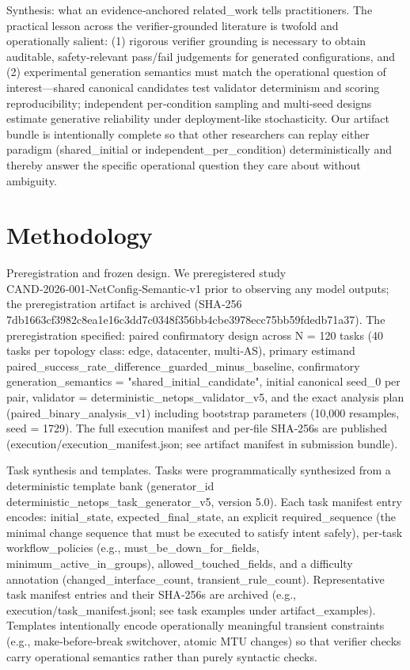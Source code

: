 \documentclass[conference]{IEEEtran}
\begin{document}
Synthesis: what an evidence‑anchored related\_work tells practitioners. The practical lesson across the verifier‑grounded literature is twofold and operationally salient: (1) rigorous verifier grounding is necessary to obtain auditable, safety‑relevant pass/fail judgements for generated configurations, and (2) experimental generation semantics must match the operational question of interest---shared canonical candidates test validator determinism and scoring reproducibility; independent per‑condition sampling and multi‑seed designs estimate generative reliability under deployment‑like stochasticity. Our artifact bundle is intentionally complete so that other researchers can replay either paradigm (shared\_initial or independent\_per\_condition) deterministically and thereby answer the specific operational question they care about without ambiguity.

\section{Methodology}
Preregistration and frozen design. We preregistered study CAND‑2026‑001‑NetConfig‑Semantic‑v1 prior to observing any model outputs; the preregistration artifact is archived (SHA‑256 7db1663cf3982c8ea1e16c3dd7c0348f356bb4cbe3978ecc75bb59fdedb71a37). The preregistration specified: paired confirmatory design across N = 120 tasks (40 tasks per topology class: edge, datacenter, multi‑AS), primary estimand paired\_success\_rate\_difference\_guarded\_minus\_baseline, confirmatory generation\_semantics = "shared\_initial\_candidate", initial canonical seed\_0 per pair, validator = deterministic\_netops\_validator\_v5, and the exact analysis plan (paired\_binary\_analysis\_v1) including bootstrap parameters (10,000 resamples, seed = 1729). The full execution manifest and per‑file SHA‑256s are published (execution/execution\_manifest.json; see artifact manifest in submission bundle).

Task synthesis and templates. Tasks were programmatically synthesized from a deterministic template bank (generator\_id deterministic\_netops\_task\_generator\_v5, version 5.0). Each task manifest entry encodes: initial\_state, expected\_final\_state, an explicit required\_sequence (the minimal change sequence that must be executed to satisfy intent safely), per‑task workflow\_policies (e.g., must\_be\_down\_for\_fields, minimum\_active\_in\_groups), allowed\_touched\_fields, and a difficulty annotation (changed\_interface\_count, transient\_rule\_count). Representative task manifest entries and their SHA‑256s are archived (e.g., execution/task\_manifest.jsonl; see task examples under artifact\_examples). Templates intentionally encode operationally meaningful transient constraints (e.g., make‑before‑break switchover, atomic MTU changes) so that verifier checks carry operational semantics rather than purely syntactic checks.
\end{document}
